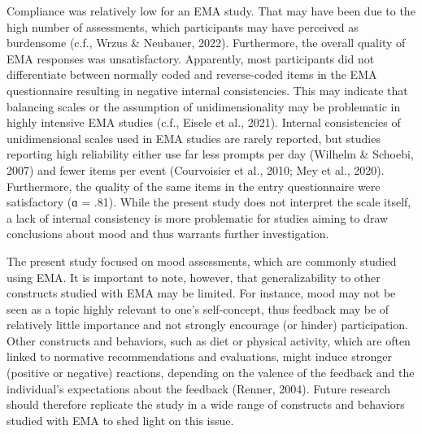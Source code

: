 \documentclass[authordate, empirical]{jote-new-article}
\begin{document}
	Compliance was relatively low for an EMA study. That may have been due to the high number of assessments, which participants may have perceived as burdensome (c.f., Wrzus \& Neubauer, 2022). Furthermore, the overall quality of EMA responses was unsatisfactory. Apparently, most participants did not differentiate between normally coded and reverse-coded items in the EMA questionnaire resulting in negative internal consistencies. This may indicate that balancing scales or the assumption of unidimensionality may be problematic in highly intensive EMA studies (c.f., Eisele et al., 2021). Internal consistencies of unidimensional scales used in EMA studies are rarely reported, but studies reporting high reliability either use far less prompts per day (Wilhelm \& Schoebi, 2007) and fewer items per event (Courvoisier et al., 2010; Mey et al., 2020). Furthermore, the quality of the same items in the entry questionnaire were satisfactory (ɑ = .81). While the present study does not interpret the scale itself, a lack of internal consistency is more problematic for studies aiming to draw conclusions about mood and thus warrants further investigation.



	The present study focused on mood assessments, which are commonly studied using EMA. It is important to note, however, that generalizability to other constructs studied with EMA may be limited. For instance, mood may not be seen as a topic highly relevant to one's self-concept, thus feedback may be of relatively little importance and not strongly encourage (or hinder) participation. Other constructs and behaviors, such as diet or physical activity, which are often linked to normative recommendations and evaluations, might induce stronger (positive or negative) reactions, depending on the valence of the feedback and the individual's expectations about the feedback (Renner, 2004). Future research should therefore replicate the study in a wide range of constructs and behaviors studied with EMA to shed light on this issue.
\end{document}
